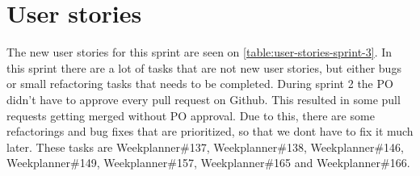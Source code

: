 \section{User stories}
The new user stories for this sprint are seen on \autoref{table:user-stories-sprint-3}.
In this sprint there are a lot of tasks that are not new user stories, but either bugs or small refactoring tasks that needs to be completed.
During sprint 2 the PO didn't have to approve every pull request on Github. 
This resulted in some pull requests getting merged without PO approval.
Due to this, there are some refactorings and bug fixes that are prioritized, so that we dont have to fix it much later.
These tasks are Weekplanner\#137, Weekplanner\#138, Weekplanner\#146, Weekplanner\#149, Weekplanner\#157, Weekplanner\#165 and Weekplanner\#166.

